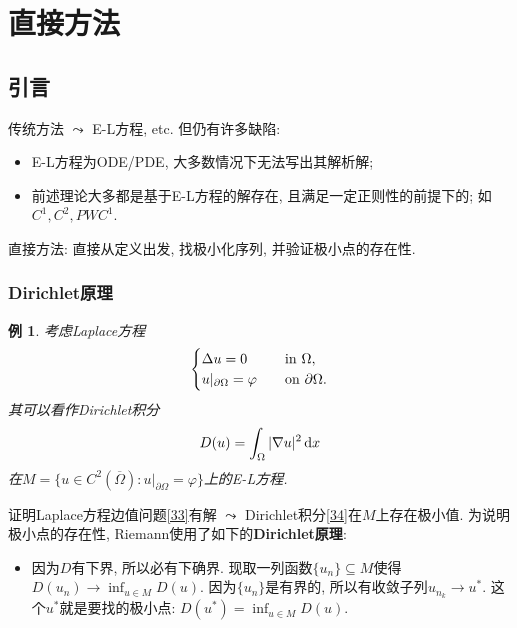 \documentclass[12pt,a4paper]{article}
\newtheorem{example}[theorem]{例}
\begin{document}
\section{直接方法}

\subsection{引言}

传统方法 $\leadsto$ E-L方程, etc. 但仍有许多缺陷:
\begin{itemize}
    \item E-L方程为ODE/PDE, 大多数情况下无法写出其解析解;
    \item 前述理论大多都是基于E-L方程的解存在, 且满足一定正则性的前提下的; 如$C^1, C^2, PWC^1$.
\end{itemize}

直接方法: 直接从定义出发, 找极小化序列, 并验证极小点的存在性.

\subsubsection{Dirichlet原理}

\begin{example}
    考虑Laplace方程
    \begin{equation}\label{33}
        \begin{cases}
            \Delta u = 0 \quad &{\rm in} \ \Omega, \\ 
            u|_{\partial\Omega} = \varphi \quad &{\rm on}\ \partial\Omega.
        \end{cases}
    \end{equation}
    其可以看作Dirichlet积分
    \begin{equation}\label{34}
        D(u) = \int_{\Omega}|\nabla u|^2 \,{\rm d}x
    \end{equation}
    在$M = \{u \in C^2(\overline{\Omega})\colon u|_{\partial\Omega} = \varphi\}$上的E-L方程.
\end{example}

证明Laplace方程边值问题\eqref{33}有解 $\leadsto$ Dirichlet积分\eqref{34}在$M$上存在极小值.
为说明极小点的存在性, Riemann使用了如下的\textbf{Dirichlet原理}:

\begin{itemize}
    \item 因为$D$有下界, 所以必有下确界. 现取一列函数$\{u_n\} \subseteq M$使得$D(u_n) \rightarrow \inf_{u \in M}D(u)$.
    因为$\{u_n\}$是有界的, 所以有收敛子列$u_{n_k} \rightarrow u^*$. 这个$u^*$就是要找的极小点: $D(u^*) = \inf_{u \in M}D(u)$.
\end{itemize}
\end{document}
